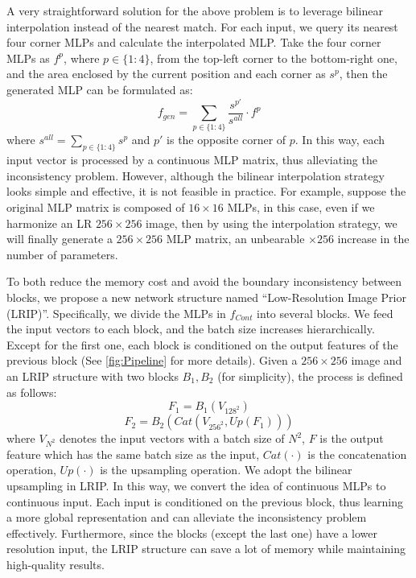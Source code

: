 \documentclass[10pt,journal,twocolumn,twoside]{IEEEtran}
\begin{document}
A very straightforward solution for the above problem is to leverage bilinear interpolation instead of the nearest match. For each input, we query its nearest four corner MLPs and calculate the interpolated MLP. Take the four corner MLPs as $f^p$, where $p \in \{1: 4\}$, from the top-left corner to the bottom-right one, and the area enclosed by the current position and each corner as $s^p$, then the generated MLP can be formulated as:
\begin{equation}
  f_{gen} = \sum_{p\in \{1:4\}}\frac{s^{p'}}{s^{all}}\cdot f^p
  \label{eq:bilinear2}
\end{equation}
where $s^{all}=\sum_{p\in \{1:4\}}s^p$ and $p'$ is the opposite corner of $p$. In this way, each input vector is processed by a continuous MLP matrix, thus alleviating the inconsistency problem. However, although the bilinear interpolation strategy looks simple and effective, it is not feasible in practice. For example, suppose the original MLP matrix is composed of $16\times16$ MLPs, in this case, even if we harmonize an LR $256\times256$ image, then by using the interpolation strategy, we will finally generate a $256\times256$ MLP matrix, an unbearable $\times256$ increase in the number of parameters.

To both reduce the memory cost and avoid the boundary inconsistency between blocks, we propose a new network structure named ``Low-Resolution Image Prior (LRIP)''. Specifically, we divide the MLPs in $f_{Cont}$ into several blocks. We feed the input vectors to each block, and the batch size increases hierarchically. Except for the first one, each block is conditioned on the output features of the previous block (See \cref{fig:Pipeline} for more details). Given a $256\times256$ image and an LRIP structure with two blocks $B_1, B_2$ (for simplicity), the process is defined as follows:
\begin{equation}
  F_1 = B_1(V_{128^2})
  \label{eq:LRIP1}
\end{equation}
\begin{equation}
  F_2 = B_2(Cat(V_{256^2}, Up(F_1)))
  \label{eq:LRIP2}
\end{equation}
where $V_{N^2}$ denotes the input vectors with a batch size of $N^2$, $F$ is the output feature which has the same batch size as the input, $Cat(\cdot)$ is the concatenation operation, $Up(\cdot)$ is the upsampling operation. We adopt the bilinear upsampling in LRIP. In this way, we convert the idea of continuous MLPs to continuous input. Each input is conditioned on the previous block, thus learning a more global representation and can alleviate the inconsistency problem effectively. Furthermore, since the blocks (except the last one) have a lower resolution input, the LRIP structure can save a lot of memory while maintaining high-quality results. 
\end{document}
